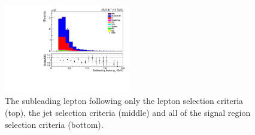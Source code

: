 \begin{figure}[ht]
\includegraphics[width=0.49\textwidth]{figs/background-estimation/plots/unblinded/prompt_mumu_ttbarInc/lep2Pt_NPL_mumu_wMass_mumu.pdf}
\caption{
The subleading lepton \pT following only the lepton selection criteria (top), the jet selection criteria (middle) and all of the signal region selection criteria (bottom).
}
\label{fig:App_SR_lep2Pt}
\end{figure}

